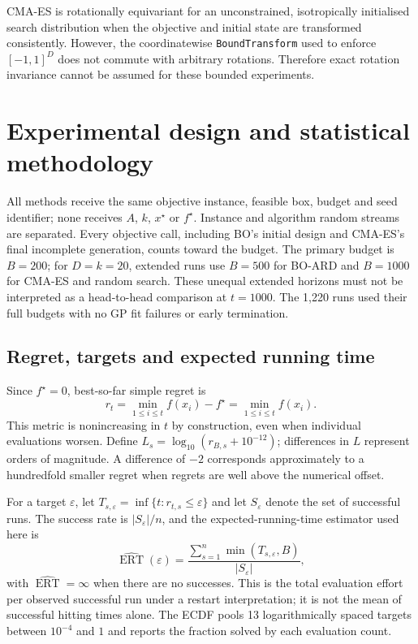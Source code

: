 \documentclass[11pt,a4paper]{article}
\begin{document}
CMA-ES is rotationally equivariant for an unconstrained, isotropically initialised search distribution when the objective and initial state are transformed consistently. However, the coordinatewise \texttt{BoundTransform} used to enforce $[-1,1]^D$ does not commute with arbitrary rotations. Therefore exact rotation invariance cannot be assumed for these bounded experiments.

\section{Experimental design and statistical methodology}
All methods receive the same objective instance, feasible box, budget and seed identifier; none receives $A$, $k$, $x^\star$ or $f^\star$. Instance and algorithm random streams are separated. Every objective call, including BO's initial design and CMA-ES's final incomplete generation, counts toward the budget. The primary budget is $B=200$; for $D=k=20$, extended runs use $B=500$ for BO-ARD and $B=1000$ for CMA-ES and random search. These unequal extended horizons must not be interpreted as a head-to-head comparison at $t=1000$. The 1,220 runs used their full budgets with no GP fit failures or early termination.

\subsection{Regret, targets and expected running time}
Since $f^\star=0$, best-so-far simple regret is
\begin{equation}r_t=\min_{1\le i\le t}f(x_i)-f^\star=\min_{1\le i\le t}f(x_i).\end{equation}
This metric is nonincreasing in $t$ by construction, even when individual evaluations worsen. Define $L_s=\log_{10}(r_{B,s}+10^{-12})$; differences in $L$ represent orders of magnitude. A difference of $-2$ corresponds approximately to a hundredfold smaller regret when regrets are well above the numerical offset.

For a target $\varepsilon$, let $T_{s,\varepsilon}=\inf\{t:r_{t,s}\le\varepsilon\}$ and let $S_\varepsilon$ denote the set of successful runs. The success rate is $|S_\varepsilon|/n$, and the expected-running-time estimator used here is
\begin{equation}\widehat{\operatorname{ERT}}(\varepsilon)=\frac{\sum_{s=1}^n\min(T_{s,\varepsilon},B)}{|S_\varepsilon|},\end{equation}
with $\widehat{\operatorname{ERT}}=\infty$ when there are no successes. This is the total evaluation effort per observed successful run under a restart interpretation; it is not the mean of successful hitting times alone. The ECDF pools 13 logarithmically spaced targets between $10^{-4}$ and $1$ and reports the fraction solved by each evaluation count.
\end{document}
